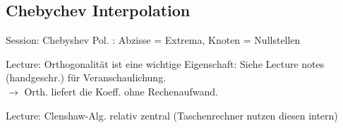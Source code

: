 \newsection
\subsection{Chebychev Interpolation}

Session: Chebyshev Pol. : Abzisse = Extrema, Knoten = Nullstellen

Lecture: Orthogonalität ist eine wichtige Eigenschaft: Siehe Lecture notes (handgeschr.) für Veranschaulichung. \\
$\rightarrow$ Orth. liefert die Koeff. ohne Rechenaufwand.

Lecture: Clenshaw-Alg. relativ zentral (Taschenrechner nutzen diesen intern)
